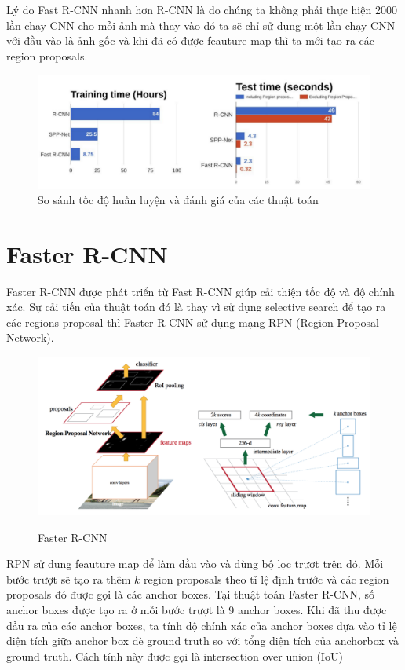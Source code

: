 Lý do Fast R-CNN nhanh hơn R-CNN là do chúng ta không phải thực hiện 2000 lần chạy CNN cho mỗi ảnh mà thay vào đó ta sẽ chỉ sử dụng một lần chạy CNN với đầu vào là ảnh gốc và khi đã có được feauture map thì ta mới tạo ra các region proposals.
\begin{figure}[H]
\begin{center}
\includegraphics[scale=0.3]{chap4/image/hieusuat.png}
\caption{So sánh tốc độ huấn luyện và đánh giá của các thuật toán}
\end{center}
\end{figure}
\section{Faster R-CNN}
Faster R-CNN được phát triển từ Fast R-CNN giúp cải thiện tốc độ và độ chính xác. Sự cải tiến của thuật toán đó là thay vì sử dụng selective search để tạo ra các regions proposal thì Faster R-CNN sử dụng mạng RPN (Region Proposal Network).
\begin{figure}[H]
\begin{center}
\label{fig:convFeatureMap}
\includegraphics[scale= 0.5]{chap4/image/fasterrcnn.png}
\caption{Faster R-CNN}
\end{center}
\end{figure}
RPN sử dụng feauture map để làm đầu vào và dùng bộ lọc trượt trên đó. Mỗi bước trượt sẽ tạo ra thêm $k$ region proposals theo tỉ lệ định trước và các region proposals đó được gọi là các anchor boxes. Tại thuật toán Faster R-CNN, số anchor boxes được tạo ra ở mỗi bước trượt là 9 anchor boxes. Khi đã thu được đầu ra của các anchor boxes, ta tính độ chính xác của anchor boxes dựa vào tỉ lệ diện tích giữa anchor box đè ground truth so với tổng diện tích của anchorbox và ground truth. Cách tính này được gọi là intersection over union (IoU)

